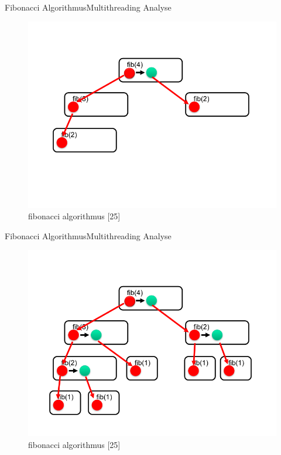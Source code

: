 \documentclass{beamer}
\begin{document}
\begin{frame}{Fibonacci Algorithmus}{Multithreading Analyse}

\begin{figure}
\centering
\includegraphics[width=0.7\columnwidth]{./assets/Slide041.png}
\caption{fibonacci algorithmus \cite{Herlihy1}[25]}
\label{fig:my_label}
\end{figure}

\end{frame}


\begin{frame}{Fibonacci Algorithmus}{Multithreading Analyse}

\begin{figure}
\centering
\includegraphics[width=0.7\columnwidth]{./assets/Slide042.png}
\caption{fibonacci algorithmus \cite{Herlihy1}[25]}
\label{fig:my_label}
\end{figure}

\end{frame}
\end{document}
